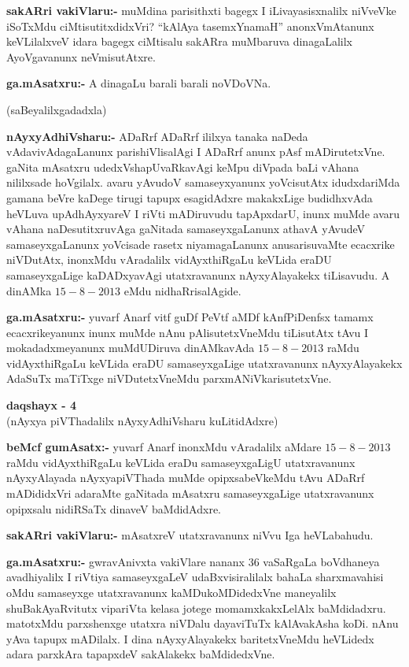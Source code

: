 \smallskip
\noindent
\textbf{sakARri vakiVlaru:-} muMdina parisithxti bagegx I iLivayasisxnalilx niVveVke iSoTxMdu ciMtisutitxdidxVri? ``kAlAya tasemxYnamaH'' anonxVmAtanunx keVLilalxveV idara bagegx ciMtisalu sakARra muMbaruva dinagaLalilx AyoVgavanunx neVmisutAtxre.

\smallskip
\noindent
\textbf{ga.mAsatxru:-} A dinagaLu barali barali noVDoVNa.

\begin{center}
(saBeyalilxgadadxla)
\end{center}

\smallskip
\noindent
\textbf{nAyxyAdhiVsharu:-} ADaRrf ADaRrf ililxya tanaka naDeda vAdavivAdagaLanunx parishiVlisalAgi I ADaRrf anunx pAsf mADirutetxVne. gaNita mAsatxru udedxVshapUvaRkavAgi keMpu diVpada baLi vAhana nililxsade hoVgilalx. avaru yAvudoV samaseyxyanunx yoVcisutAtx idudxdariMda gamana beVre kaDege tirugi tapupx esagidAdxre makakxLige budidhxvAda heVLuva upAdhAyxyareV I riVti mADiruvudu tapApxdarU, inunx muMde avaru vAhana naDesutitxruvAga gaNitada samaseyxgaLanunx athavA yAvudeV samaseyxgaLanunx yoVcisade rasetx niyamagaLanunx anusarisuvaMte ecacxrike niVDutAtx, inonxMdu vAradalilx vidAyxthiRgaLu keVLida eraDU samaseyxgaLige kaDADxyavAgi utatxravanunx nAyxyAlayakekx tiLisavudu. A dinAMka $15-8-2013$ eMdu nidhaRrisalAgide.

\smallskip
\noindent
\textbf{ga.mAsatxru:-} yuvarf Anarf vitf guDf PeVtf aMDf kAnfPiDenfsx tamamx ecacxrikeyanunx inunx muMde nAnu pAlisutetxVneMdu tiLisutAtx tAvu I mokadadxmeyanunx muMdUDiruva dinAMkavAda $15-8-2013$ raMdu vidAyxthiRgaLu keVLida eraDU samaseyxgaLige utatxravanunx nAyxyAlayakekx AdaSuTx maTiTxge niVDutetxVneMdu parxmANiVkarisutetxVne.

\begin{center}
{\bf  daqshayx - {\rm 4}}\\
(nAyxya piVThadalilx nAyxyAdhiVsharu kuLitidAdxre)
\end{center}

\smallskip
\noindent
\textbf{beMcf gumAsatx:-} yuvarf Anarf inonxMdu vAradalilx aMdare $15-8-2013$ raMdu vidAyxthiRgaLu keVLida eraDu samaseyxgaLigU utatxravanunx nAyxyAlayada nAyxyapiVThada muMde opipxsabeVkeMdu tAvu ADaRrf mADididxVri adaraMte gaNitada mAsatxru samaseyxgaLige utatxravanunx opipxsalu nidiRSaTx dinaveV baMdidAdxre.

\smallskip
\noindent
\textbf{sakARri vakiVlaru:-} mAsatxreV utatxravanunx niVvu Iga heVLabahudu.

\smallskip
\noindent
\textbf{ga.mAsatxru:-} gwravAnivxta vakiVlare nananx {\rm 36} vaSaRgaLa boVdhaneya avadhiyalilx I riVtiya samaseyxgaLeV udaBxvisiralilalx bahaLa sharxmavahisi oMdu samaseyxge utatxravanunx kaMDukoMDidedxVne maneyalilx shuBakAyaRvitutx vipariVta kelasa jotege momamxkakxLelAlx baMdidadxru. matotxMdu parxshenxge utatxra niVDalu dayaviTuTx kAlAvakAsha koDi. nAnu yAva tapupx mADilalx. I dina nAyxyAlayakekx baritetxVneMdu heVLidedx adara parxkAra tapapxdeV sakAlakekx baMdidedxVne.

